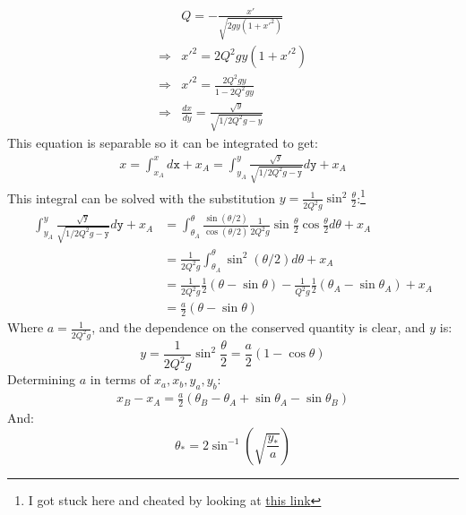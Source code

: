 \documentclass[12pt,a4]{article}
\begin{document}
\begin{enumerate}
\begin{enumerate}
        \begin{align*}
                      & Q = - \frac{x'}{\sqrt{2gy(1 + x'^2)}}\\
          \Rightarrow & x'^2  = 2Q^2gy(1 + x'^2)\\
          \Rightarrow & x'^2  = \frac{2Q^2gy}{1 - 2Q^2gy}\\
          \Rightarrow & \frac{dx}{dy}  = \frac{\sqrt{y}}{\sqrt{1/2Q^2g - y}}
        \end{align*}
        This equation is separable so it can be integrated to get:
        \begin{align*}
          x = \int_{x_A}^{x}d\mathtt{x} + x_A = \int_{y_A}^{y}\frac{\sqrt{\mathtt{y}}}{\sqrt{1/2Q^2g - \mathtt{y}}} d \mathtt{y} + x_A
        \end{align*}
        This integral can be solved with the substitution $y = \frac{1}{2Q^2g}\sin^2\frac{\theta}{2}$:\footnote{I got stuck here and cheated by looking at \href{https://www.ucl.ac.uk/~ucahmto/latex_html/chapter2_latex2html/node7.html}{this link}}
        \begin{align*}
             \int_{y_A}^{y}\frac{\sqrt{\mathtt{y}}}{\sqrt{1/2Q^2g - \mathtt{y}}} d \mathtt{y} + x_A
          &= \int_{\theta_A}^{\theta}\frac{\sin(\theta/2)}{\cos(\theta/2)} \frac{1}{2Q^2g} \sin \frac{\theta}{2} \cos \frac{\theta}{2} d {\theta} + x_A\\
          &= \frac{1}{2Q^2g} \int_{\theta_A}^{\theta}\sin^2(\theta/2) d {\theta} + x_A\\
          &= \frac{1}{2Q^2g}\frac{1}{2}\left(\theta - \sin \theta \right) - \frac{1}{Q^2g}\frac{1}{2}\left(\theta_A - \sin \theta_A \right) + x_A\\
          &= \frac{a}{2}\left(\theta - \sin \theta \right)
        \end{align*}
        Where $a = \frac{1}{2Q^2 g}$, and the dependence on the conserved quantity is clear, and $y$ is:
        \begin{equation*}
          y = \frac{1}{2Q^2g}\sin^2\frac{\theta}{2} = \frac{a}{2}(1 - \cos \theta)
        \end{equation*}
        Determining $a$ in terms of $x_a, x_b, y_a, y_b$:
        \begin{align*}
          x_B - x_A = \frac{a}{2} \left(\theta_B - \theta_A +\sin \theta_A -\sin\theta_B\right)
        \end{align*}
        And:
        \begin{equation*}
          \theta_{*} = 2\sin^{-1}\left(\sqrt{\frac{ y_{*}}{a}}\right)

\end{equation*}
\end{enumerate}
\end{enumerate}
\end{document}

